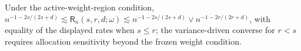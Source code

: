 Under the active-weight-region condition, \(n^{-1-2s/(2s+d)}\lesssim\mathsf R_n(s,r,d;\omega)\lesssim n^{-1-2s/(2s+d)}\vee n^{-1-2r/(2r+d)}\), with equality of the displayed rates when \(s\leq r\); the variance-driven converse for \(r<s\) requires allocation sensitivity beyond the frozen weight condition.